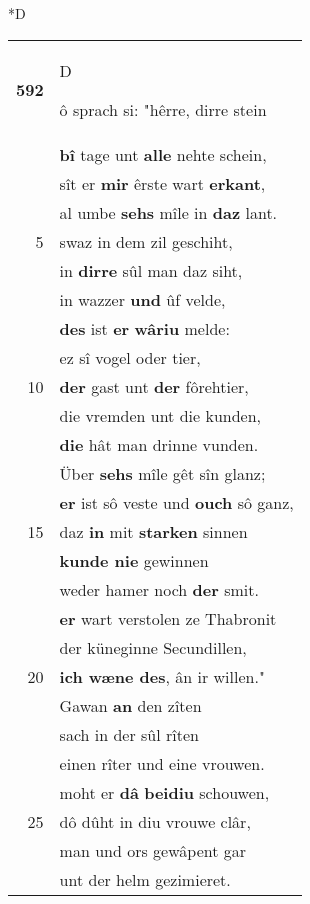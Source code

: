 \documentclass[8pt,a4paper,notitlepage]{article}
\begin{document}
\begin{table}[ht]
\begin{minipage}[t]{0.5\linewidth}
\small
\begin{center}*D
\end{center}
\begin{tabular}{rl}
\textbf{592} & \begin{large}D\end{large}ô sprach si: "hêrre, dirre stein\\ 
 & \textbf{bî} tage unt \textbf{alle} nehte schein,\\ 
 & sît er \textbf{mir} êrste wart \textbf{erkant},\\ 
 & al umbe \textbf{sehs} mîle in \textbf{daz} lant.\\ 
5 & swaz in dem zil geschiht,\\ 
 & in \textbf{dirre} sûl man daz siht,\\ 
 & in wazzer \textbf{und} ûf velde,\\ 
 & \textbf{des} ist \textbf{er} \textbf{wâriu} melde:\\ 
 & ez sî vogel oder tier,\\ 
10 & \textbf{der} gast unt \textbf{der} fôrehtier,\\ 
 & die vremden unt die kunden,\\ 
 & \textbf{die} hât man drinne vunden.\\ 
 & Über \textbf{sehs} mîle gêt sîn glanz;\\ 
 & \textbf{er} ist sô veste und \textbf{ouch} sô ganz,\\ 
15 & daz \textbf{in} mit \textbf{starken} sinnen\\ 
 & \textbf{kunde nie} gewinnen\\ 
 & weder hamer noch \textbf{der} smit.\\ 
 & \textbf{er} wart verstolen ze Thabronit\\ 
 & der küneginne Secundillen,\\ 
20 & \textbf{ich wæne des}, ân ir willen."\\ 
 & Gawan \textbf{an} den zîten\\ 
 & sach in der sûl rîten\\ 
 & einen rîter und eine vrouwen.\\ 
 & moht er \textbf{dâ} \textbf{beidiu} schouwen,\\ 
25 & dô dûht in diu vrouwe clâr,\\ 
 & man und ors gewâpent gar\\ 
 & unt der helm gezimieret.\\ 

\end{tabular}
\end{minipage}
\end{table}
\end{document}

